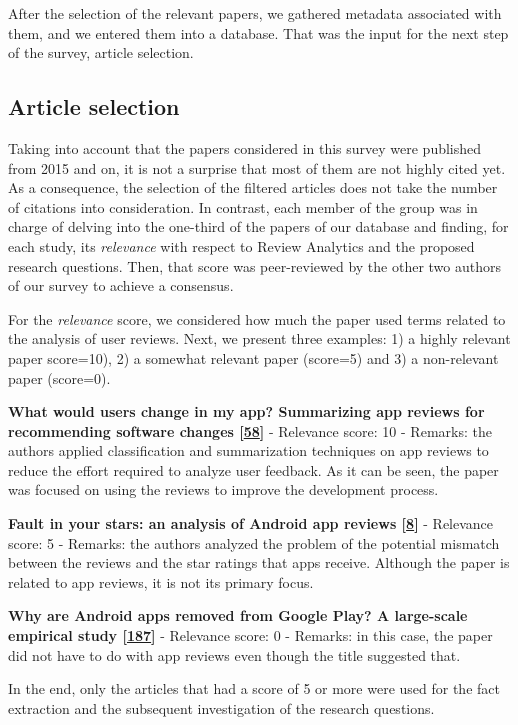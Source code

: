 \documentclass[]{book}
\begin{document}
After the selection of the relevant papers, we gathered metadata
associated with them, and we entered them into a database. That was the
input for the next step of the survey, article selection.

\subsection{Article selection}\label{article-selection}

Taking into account that the papers considered in this survey were
published from 2015 and on, it is not a surprise that most of them are
not highly cited yet. As a consequence, the selection of the filtered
articles does not take the number of citations into consideration. In
contrast, each member of the group was in charge of delving into the
one-third of the papers of our database and finding, for each study, its
\emph{relevance} with respect to Review Analytics and the proposed
research questions. Then, that score was peer-reviewed by the other two
authors of our survey to achieve a consensus.

For the \emph{relevance} score, we considered how much the paper used
terms related to the analysis of user reviews. Next, we present three
examples: 1) a highly relevant paper score=10), 2) a somewhat relevant
paper (score=5) and 3) a non-relevant paper (score=0).

\textbf{What would users change in my app? Summarizing app reviews for
recommending software changes
{[}\protect\hyperlink{ref-di2016would}{58}{]}} - Relevance score: 10 -
Remarks: the authors applied classification and summarization techniques
on app reviews to reduce the effort required to analyze user feedback.
As it can be seen, the paper was focused on using the reviews to improve
the development process.

\textbf{Fault in your stars: an analysis of Android app reviews
{[}\protect\hyperlink{ref-aralikatte2018fault}{8}{]}} - Relevance score:
5 - Remarks: the authors analyzed the problem of the potential mismatch
between the reviews and the star ratings that apps receive. Although the
paper is related to app reviews, it is not its primary focus.

\textbf{Why are Android apps removed from Google Play? A large-scale
empirical study {[}\protect\hyperlink{ref-wang2018android}{187}{]}} -
Relevance score: 0 - Remarks: in this case, the paper did not have to do
with app reviews even though the title suggested that.

In the end, only the articles that had a score of 5 or more were used
for the fact extraction and the subsequent investigation of the research
questions.
\end{document}
